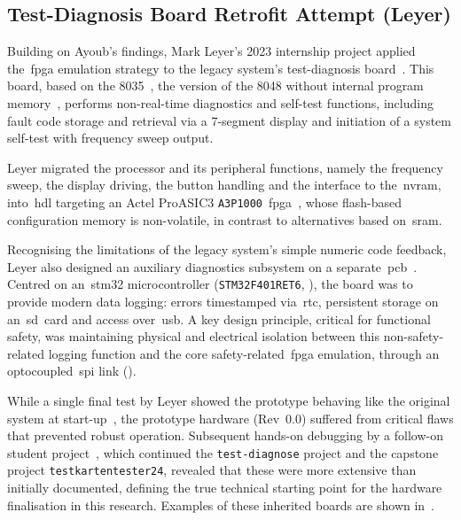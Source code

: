 \subsection{Test-Diagnosis Board Retrofit Attempt (Leyer)}
\label{subsec:leyer_internship}

Building on Ayoub's findings, Mark Leyer's 2023 internship project applied the~\gls{fpga} emulation strategy to the legacy system's test-diagnosis board~\cite{leyer2023}. This board, based on the 8035~\cite{leyer2023ppt}, the version of the 8048 without internal program memory~\cite[p.~1-2]{intel_mcs48_1978}, performs non-real-time diagnostics and self-test functions, including fault code storage and retrieval via a 7-segment display and initiation of a system self-test with frequency sweep output.

Leyer migrated the processor and its peripheral functions, namely the frequency sweep, the display driving, the button handling and the interface to the~\gls{nvram}, into~\gls{hdl} targeting an Actel ProASIC3 \texttt{A3P1000}~\gls{fpga}~\cite[Fig.~2]{leyer2023}, whose flash-based configuration memory is non-volatile, in contrast to alternatives based on~\gls{sram}.

Recognising the limitations of the legacy system's simple numeric code feedback, Leyer also designed an auxiliary diagnostics subsystem on a separate~\gls{pcb}~\cite{leyer2023, leyer2023ppt}. Centred on an~\gls{stm32} microcontroller (\texttt{STM32F401RET6}, ), the board was to provide modern data logging: errors timestamped via~\gls{rtc}, persistent storage on an~\gls{sd}~card and access over~\gls{usb}. A key design principle, critical for functional safety, was maintaining physical and electrical isolation between this non-safety-related logging function and the core safety-related~\gls{fpga} emulation, through an optocoupled~\gls{spi} link ().

While a single final test by Leyer showed the prototype behaving like the original system at start-up~\cite[Sec.~9.1]{leyer2023}, the prototype hardware (Rev~0.0) suffered from critical flaws that prevented robust operation. Subsequent hands-on debugging by a follow-on student project~\cite[pp.~10--14]{savchuk2025}, which continued the \texttt{test-diagnose} project and the capstone project \texttt{testkartentester24}, revealed that these were more extensive than initially documented, defining the true technical starting point for the hardware finalisation in this research. Examples of these inherited boards are shown in~.


